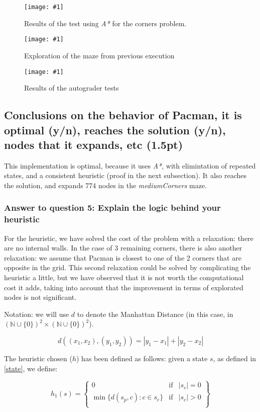 \documentclass{article}
\newcommand{\myFigure}[4]{%
    \begin{figure}[H]
        \texttt{[image: \#1]}
        \centering
        \caption{#2}
        \label{#3}
    \end{figure}
}
\begin{document}
\myFigure{./img/ex6/victoryCornersAS}{Results of the test using \emph{A*} for the corners problem.}{victoryCornersAS}{1}

\myFigure{./img/ex6/ASmedium}{Exploration of the maze from previous execution}{victoryAS}{.5}

\myFigure{./img/ex6/test6}{Results of the autograder tests}{test6}{.9}

\subsection{Conclusions on the behavior of Pacman, it is optimal (y/n), reaches the solution (y/n), nodes that it expands, etc (1.5pt)}

This implementation is optimal, because it uses \emph{A*}, with elimintation of repeated states, and a consistent heuristic (proof in the next subsection). It also reaches the solution, and expands 774 nodes in the \emph{mediumCorners} maze.

\subsubsection{Answer to question 5: Explain the logic behind your heuristic}

For the heuristic, we have solved the cost of the problem with a relaxation: there are no internal walls. In the case of 3 remaining corners, there is also another relaxation: we assume that Pacman is closest to one of the 2 corners that are opposite in the grid. This second relaxation could be solved by complicating the heuristic a little, but we have observed that it is not worth the computational cost it adds, taking into account that the improvement in terms of explorated nodes is not significant. 


Notation: we will use $d$ to denote the Manhattan Distance (in this case, in $(\mathbb{N}\cup \{0\})^2\times (\mathbb{N}\cup \{0\})^2$). 

\begin{equation}
    d((x_1,x_2),(y_1,y_2)) = |y_1-x_1| + |y_2-x_2|
\end{equation}

The heuristic chosen ($h$) has been defined as follows: given a state $s$, as defined in \ref{state}, we define:

\begin{equation}
    h_1(s) = \left\{ \begin{array}{lcc}
        0 &   \text{if}  & |s_c| = 0 \\
        \min \{d(s_p, c):c\in s_c\} &   \text{if}  & |s_c| > 0 \\
        \end{array}
        \right\}
\end{equation}
\end{document}
